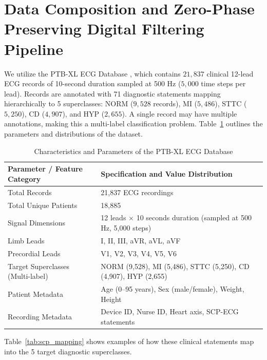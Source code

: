 \documentclass[14pt]{extarticle}
\begin{document}
\section{Data Composition and Zero-Phase Preserving Digital Filtering Pipeline}
\label{sec:dataset}
We utilize the PTB-XL ECG Database \cite{wagner2020ptbxl, strodthoff2021deep}, which contains $21{,}837$ clinical 12-lead ECG records of 10-second duration sampled at 500 Hz ($5{,}000$ time steps per lead). Records are annotated with 71 diagnostic statements mapping hierarchically to 5 superclasses: NORM ($9{,}528$ records), MI ($5{,}486$), STTC ($5{,}250$), CD ($4{,}907$), and HYP ($2{,}655$). A single record may have multiple annotations, making this a multi-label classification problem. Table~\ref{tab:ptbxl_properties_caj} outlines the parameters and distributions of the dataset.

\begin{table}[H]
\caption{Characteristics and Parameters of the PTB-XL ECG Database}
\label{tab:ptbxl_properties_caj}
\centering
\small
\begin{tabular}{|l|p{11cm}|}
\hline
\textbf{Parameter / Feature Category} & \textbf{Specification and Value Distribution} \\
\hline
Total Records & 21,837 ECG recordings \\
\hline
Total Unique Patients & 18,885 \\
\hline
Signal Dimensions & 12 leads $\times$ 10 seconds duration (sampled at 500 Hz, 5,000 steps) \\
\hline
Limb Leads & I, II, III, aVR, aVL, aVF \\
\hline
Precordial Leads & V1, V2, V3, V4, V5, V6 \\
\hline
Target Superclasses (Multi-label) & NORM (9,528), MI (5,486), STTC (5,250), CD (4,907), HYP (2,655) \\
\hline
Patient Metadata & Age (0–95 years), Sex (male/female), Weight, Height \\
\hline
Recording Metadata & Device ID, Nurse ID, Heart axis, SCP-ECG statements \\
\hline
\end{tabular}
\end{table}

Table~\ref{tab:scp_mapping} shows examples of how these clinical statements map into the 5 target diagnostic superclasses.
\end{document}
